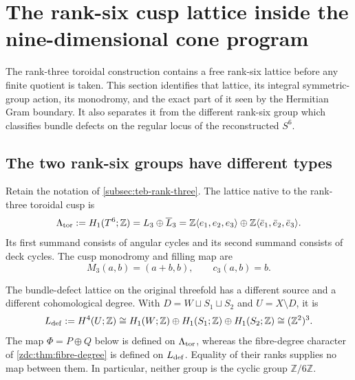 \section{The rank-six cusp lattice inside the nine-dimensional cone program}
\label{rsl:sec:rank-six}

The rank-three toroidal construction contains a free rank-six lattice before
any finite quotient is taken.  This section identifies that lattice, its
integral symmetric-group action, its monodromy, and the exact part of it seen
by the Hermitian Gram boundary.  It also separates it from the different
rank-six group which classifies bundle defects on the regular locus of the
reconstructed \(S^6\).

\subsection{The two rank-six groups have different types}
\label{rsl:subsec:two-lattices}

Retain the notation of \cref{subsec:teb-rank-three}.  The lattice native to
the rank-three toroidal cusp is
\begin{equation}
 \Lambda_{\rm tor}
 :=H_1(T^6;\mathbb Z)
 =L_3\oplus\overline L_3
 =\mathbb Z\langle e_1,e_2,e_3\rangle
  \oplus\mathbb Z\langle\bar e_1,\bar e_2,\bar e_3\rangle.
 \label{rsl:eq:tor-lattice}
\end{equation}
Its first summand consists of angular cycles and its second summand consists
of deck cycles.  The cusp monodromy and filling map are
\begin{equation}
 M_3(a,b)=(a+b,b),
 \qquad
 c_3(a,b)=b.
 \label{rsl:eq:monodromy-filling}
\end{equation}

The bundle-defect lattice on the original threefold has a different source
and a different cohomological degree.  With
\(D=W\sqcup S_1\sqcup S_2\) and \(U=X\setminus D\), it is
\begin{equation}
 L_{\rm def}:=H^4(U;\mathbb Z)
 \cong H_1(W;\mathbb Z)\oplus H_1(S_1;\mathbb Z)
                    \oplus H_1(S_2;\mathbb Z)
 \cong(\mathbb Z^2)^3.
 \label{rsl:eq:defect-lattice}
\end{equation}
The map \(\Phi=P\oplus Q\) below is defined on
\(\Lambda_{\rm tor}\), whereas the fibre-degree character of
\cref{zdc:thm:fibre-degree} is defined on \(L_{\rm def}\).  Equality of their
ranks supplies no map between them.  In particular, neither group is the
cyclic group \(\mathbb Z/6\mathbb Z\).

